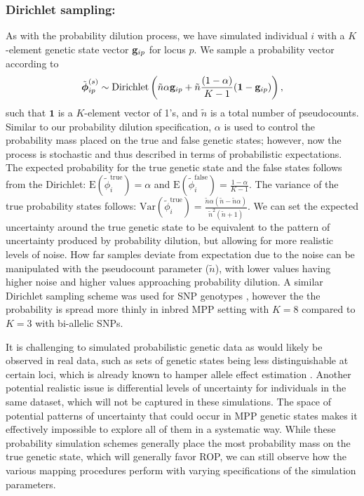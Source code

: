 \subsubsection{Dirichlet sampling:}
As with the probability dilution process, we have simulated individual $i$ with a $K$-element genetic state vector $\mathbf{g}_{ip}$ for locus $p$. We sample a probability vector according to 
\[
\tilde{\boldsymbol{\phi}}_{ip}^{(s)} \sim \text{Dirichlet}\left(\tilde{n}\alpha\mathbf{g}_{ip} + \tilde{n}\frac{(1 - \alpha)}{K-1}(\mathbf{1} - \mathbf{g}_{ip})\right),
\]
such that $\mathbf{1}$ is a $K$-element vector of 1's, and $\tilde{n}$ is a total number of pseudocounts. Similar to our probability dilution specification, $\alpha$ is used to control the probability mass placed on the true and false genetic states; however, now the process is stochastic and thus described in terms of probabilistic expectations. The expected probability for the true genetic state and the false states follows from the Dirichlet: $\text{E}(\tilde{\phi}_{i}^{\text{true}}) = \alpha$ and $\text{E}(\tilde{\phi}_{i}^{\text{false}}) = \frac{1 - \alpha}{K-1}$. The variance of the true probability states follows: $\text{Var}(\tilde{\phi}_{i}^{\text{true}}) = \frac{\tilde{n}\alpha(\tilde{n} - \tilde{n}\alpha)}{\tilde{n}^{2}(\tilde{n} + 1)}$. We can set the expected uncertainty around the true genetic state to be equivalent to the pattern of uncertainty produced by probability dilution, but allowing for more realistic levels of noise. How far samples deviate from expectation due to the noise can be manipulated with the pseudocount parameter ($\tilde{n}$), with lower values having higher noise and higher values approaching probability dilution. A similar Dirichlet sampling scheme was used for SNP genotypes \citep{Acar2013}, however the the probability is spread more thinly in inbred MPP setting with $K=8$ compared to $K=3$ with bi-allelic SNPs.

It is challenging to simulated probabilistic genetic data as would likely be observed in real data, such as sets of genetic states being less distinguishable at certain loci, which is already known to hamper allele effect estimation \citep{Zhang2014}. Another potential realistic issue is differential levels of uncertainty for individuals in the same dataset, which will not be captured in these simulations. The space of potential patterns of uncertainty that could occur in MPP genetic states makes it effectively impossible to explore all of them in a systematic way. While these probability simulation schemes generally place the most probability mass on the true genetic state, which will generally favor ROP, we can still observe how the various mapping procedures perform with varying specifications of the simulation parameters.

